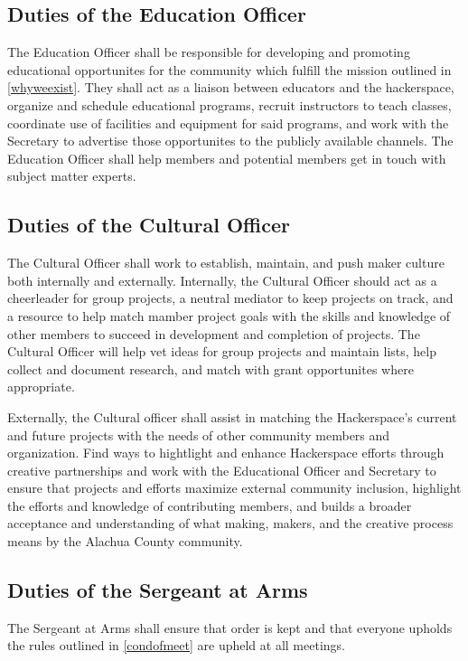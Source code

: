 \documentclass[10pt,letterpaper,titlepage]{article}
\begin{document}
\subsection{Duties of the Education Officer}

The Education Officer shall be responsible for developing and promoting
educational opportunites for the community which fulfill the mission outlined 
in \ref{whyweexist}. They shall act as a liaison between educators and the 
hackerspace, organize and schedule educational programs, recruit instructors 
to teach classes, coordinate use of facilities and equipment for said programs, 
and work with the Secretary to advertise those opportunites to the publicly 
available channels. The Education Officer shall help members and potential 
members get in touch with subject matter experts.

\subsection{Duties of the Cultural Officer}

The Cultural Officer shall work to establish, maintain, and push maker culture
both internally and externally. Internally, the Cultural Officer should act as
a cheerleader for group projects, a neutral mediator to keep projects on track,
and a resource to help match mamber project goals with the skills and knowledge
of other members to succeed in development and completion of projects. The 
Cultural Officer will help vet ideas for group projects and maintain lists, help
collect and document research, and match with grant opportunites where appropriate.

Externally, the Cultural officer shall assist in matching the Hackerspace's
current and future projects with the needs of other community members and
organization. Find ways to hightlight and enhance Hackerspace efforts through
creative partnerships and work with the Educational Officer and Secretary to
ensure that projects and efforts maximize external community inclusion, highlight
the efforts and knowledge of contributing members, and builds a broader acceptance
and understanding of what making, makers, and the creative process means by the
Alachua County community.

\subsection{Duties of the Sergeant at Arms}

The Sergeant at Arms shall ensure that order is kept and that everyone upholds
the rules outlined in \ref{condofmeet} are upheld at all meetings.
\end{document}
